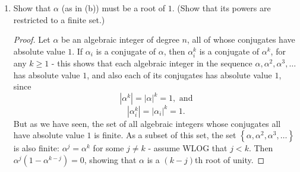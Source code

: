 \documentclass[12pt]{article}
\theoremstyle{definition}
\newenvironment{problem}[2][Problem]{\begin{trivlist}
\item[\hskip \labelsep {\bfseries #1}\hskip \labelsep {\bfseries #2.}]}{\end{trivlist}}
\begin{document}
\begin{problem}{11}
\begin{enumerate}[label=(\alph*)]
\begin{proof}
			\[n \prod_{1 \leq r \leq n} \left( 2 \binom{n}{r} + 1 \right)\]
			algebraic integers of degree $n$, all of whose conjugates have absolute value $1$. 
			\end{proof}
		\item Show that $\alpha$ (as in (b)) must be a root of $1$. (Show that its powers are restricted to a finite set.)
			\begin{proof}
				Let $\alpha$ be an algebraic integer of degree $n$, all of whose conjugates have absolute value $1$. If $\alpha_i$ is a conjugate of $\alpha$, then $\alpha_i^k$ is a conjugate of $\alpha^k$, for any $k \geq 1$ - this shows that each algebraic integer in the sequence $\alpha, \alpha^2, \alpha^3, \dots$ has absolute value $1$, and also each of its conjugates has absolute value $1$, since
				\[\left \lvert { \alpha^k } \right \lvert  = \left \lvert { \alpha } \right \lvert ^k = 1, \text{ and}\]
				\[ \left \lvert { \alpha_i^k } \right \lvert = \left \lvert { \alpha_i } \right \lvert ^k = 1.\]
				But as we have seen, the set of all algebraic integers whose conjugates all have absolute value $1$ is finite. As a subset of this set, the set $\left\{ \alpha, \alpha^2, \alpha^3, \dots \right\}$ is also finite: $\alpha^j = \alpha^k$ for some $j \neq k$ - assume WLOG that $j < k$. Then $\alpha^{j}(1 - \alpha^{k-j}) = 0$, showing that $\alpha$ is a $(k - j)$th root of unity. 
			\end{proof}
	\end{enumerate}
\end{problem}
\end{document}
